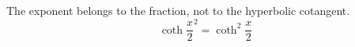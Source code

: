 \documentclass{article}
\begin{document}
The exponent belongs to the fraction, not to the hyperbolic cotangent.
\begin{equation}
  \coth\frac{x}{2}^2 = \coth^2\frac{x}{2}
\end{equation}
\end{document}

